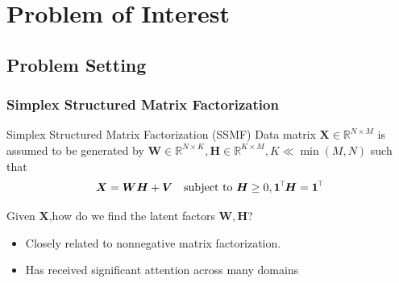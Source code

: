 \documentclass[10pt,xcolor={usenames,dvipsnames,table}]{beamer}
\def\blue{\color{blue}}
\newcommand{\T}{\!\top\!}
\newcommand{\citep}[1]{{\blue \scriptsize \parencite{#1}}}
\begin{document}
\section{Problem of Interest}%

\subsection{Problem Setting}%
\label{sub:separable_nmf}


\begin{frame}
    \frametitle{Simplex Structured Matrix Factorization}

    {
    \begin{block}{Simplex Structured Matrix Factorization (SSMF)}
    Data matrix $\bm{X} \in \mathbb{R}^{N \times M}$ is assumed to be generated by $\bm{W} \in \mathbb{R}^{N \times K}, \bm{H} \in \mathbb{R}^{K \times M}, K \ll \min(M, N)$  such that
    \[
    \bm{X} = \bm{W} \bm{H} + \bm{V} \quad \text{\rm subject to } \bm{H} \geq 0 , \bm{1}^{\T}\bm{H} = \bm{1}^{\T}
    \] 
    \end{block}}
    \begin{block}
        
    Given $\bm{X}$,how do we find the latent factors $\bm{W}, \bm{H}$?
    \end{block}
    \begin{itemize}
        \item Closely related to nonnegative matrix factorization.
            
\item Has received significant attention across many domains \citep{keshava2002spectral,CANMS,arora2012practical,arora2012learning,recht2012factoring,mao2017mixed,panov2018consistent,huang2019detecting,fu2016robust}
    \end{itemize}



\end{frame}
\end{document}
